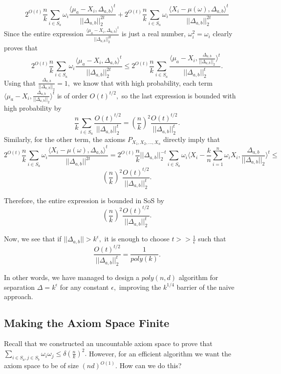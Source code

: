 \documentclass[12pt]{article}%
\begin{document}
$$
2^{O(t)}\frac{n}{k}\sum_{i \in S_a} 
\omega_i
\frac{\langle \mu_a -X_i, \Delta_{a,b}\rangle^t
}{||\Delta_{a,b}||_2^{2t}}
 + 
2^{O(t)}\frac{n}{k}\sum_{i \in S_a} 
\omega_i
\frac{\langle X_i - \mu(\omega), \Delta_{a,b}\rangle^t
}{||\Delta_{a,b}||_2^{2t}}
$$
Since the entire expression $\frac{\langle \mu_a -X_i, \Delta_{a,b}\rangle^t
}{||\Delta_{a,b}||_2^{2t}}
$ is just a real number, $\omega_i^2 = \omega_i$ clearly proves that 
$$
2^{O(t)}\frac{n}{k}\sum_{i \in S_a} 
\omega_i
\frac{\langle \mu_a -X_i, \Delta_{a,b}\rangle^t
}{||\Delta_{a,b}||_2^{2t}}
\le 
2^{O(t)}\frac{n}{k}\sum_{i \in S_a} 
\frac{\langle \mu_a -X_i, \frac{\Delta_{a,b}}{||\Delta_{a,b}||_2}\rangle^t
}{||\Delta_{a,b}||_2^{t}}.
$$
Using that $\frac{\Delta_{a,b}}{||\Delta_{a,b}||_2} = 1,$ we know that with high probability, each term $\langle \mu_a -X_i, \frac{\Delta_{a,b}}{||\Delta_{a,b}||_2}\rangle^t$ is of order $O(t)^{t/2},$ so the last expression is bounded with high probability by
$$
\frac{n}{k}\sum_{i \in S_a} \frac{O(t)^{t/2}}{||\Delta_{a,b}||_2^t} = 
\left(\frac{n}{k}\right)^2 
\frac{O(t)^{t/2}}{||\Delta_{a,b}||_2^t}.
$$
Similarly, for the other term, the axioms $P_{X_1, X_2, \ldots, X_n}$ directly imply that 
$$
2^{O(t)}\frac{n}{k}\sum_{i \in S_a} 
\omega_i
\frac{\langle X_i - \mu(\omega), \Delta_{a,b}\rangle^t
}{||\Delta_{a,b}||^{2t}} = 
2^{O(t)}\frac{n}{k} ||\Delta_{a,b}||_2^{-t}
\sum_{i \in S_a} 
\omega_i
\langle X_i - \frac{k}{n}\sum_{i=1}^n \omega_i X_i, \frac{\Delta_{a,b}}{||\Delta_{a,b}||_2}\rangle^t\le 
$$
$$
\left(\frac{n}{k}\right)^2 
\frac{O(t)^{t/2}}{||\Delta_{a,b}||^t_2}.
$$

\noindent
Therefore, the entire expression is bounded in SoS by 
$$
\left(\frac{n}{k}\right)^2 
\frac{O(t)^{t/2}}{||\Delta_{a,b}||^t_2}.
$$

\noindent
Now, we see that if $||\Delta_{a,b}||> k^\epsilon,$ it is enough to choose $t >> \frac{1}{\epsilon}$ such that 
$$
\frac{O(t)^{t/2}}{||\Delta_{a,b}||^t_2} = \frac{1}{poly(k)}.
$$

\noindent 
In other words, we have managed to design a $poly(n,d)$ algorithm for separation $\Delta = k^\epsilon$ for any constant $\epsilon,$ improving the $k^{1/4}$ barrier of the naive approach.


\subsection{Making the Axiom Space Finite}
Recall that we constructed an uncountable axiom space to prove that $\sum_{i\in S_a, j \in S_b}\omega_i\omega_j \le \delta \left(\frac{n}{k}\right)^2.$ However, for an efficient algorithm we want the axiom space to be of size $(nd)^{O(1)}.$ How can we do this?\\
\end{document}
